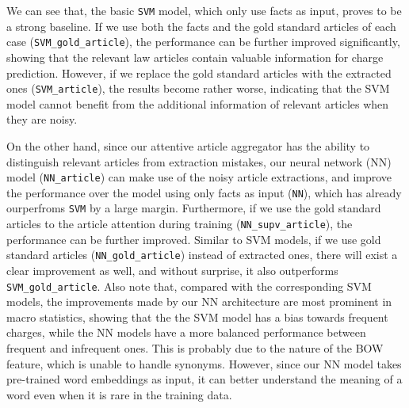 
We can see that, the basic \texttt{SVM} model, which only use facts as input, proves to be a strong baseline. If we use both the facts and the gold standard articles of each case (\texttt{SVM\_gold\_article}), the performance can be further improved significantly, showing that the relevant law articles contain valuable information for charge prediction. However, if we replace the gold standard articles with the extracted ones (\texttt{SVM\_article}), the results become rather worse, indicating that the SVM model cannot benefit from the additional information of relevant articles when they are noisy. 

On the other hand, since our attentive article aggregator has the ability to distinguish relevant articles from extraction mistakes, our neural network (NN) model (\texttt{NN\_article}) can make use of the noisy article extractions, and improve the performance over the model using only facts as input (\texttt{NN}), which has already ourperfroms \texttt{SVM} by a large margin.
Furthermore, if we use the gold standard articles to  the article attention during training (\texttt{NN\_supv\_article}), the performance can be further improved.
Similar to SVM models, if we use gold standard articles (\texttt{NN\_gold\_article}) instead of extracted ones, there will exist a clear improvement as well, and without surprise, it also outperforms \texttt{SVM\_gold\_article}.
Also note that, compared with the corresponding SVM models, the improvements made by our NN architecture are most prominent in macro statistics, showing that the the SVM model has a  bias towards frequent charges, while the NN models have a more balanced performance between frequent and infrequent ones. This is probably due to the nature of the BOW feature, which is unable to handle synonyms. However, since our NN model takes pre-trained word embeddings as input, it can better understand the meaning of a word even when it is rare in the training data. 


